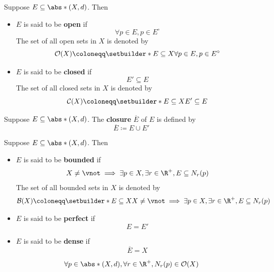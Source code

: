 \begin{definition} \label{an1:def:open-closed-sets}
  Suppose $E \subseteq \abs*{(X, d)}$. Then
  \begin{itemize}
    \item $E$ is said to be \textbf{open} if
          \[
            \forall p \in E, p \in E^{\circ}
          \]
          The set of all open sets in $X$ is denoted by
          \[
            \mathcal{O}(X) \coloneqq \setbuilder*{E \subseteq X}{\forall p \in E, p \in E^{\circ}}
          \]
    \item $E$ is said to be \textbf{closed} if
          \[
            E' \subseteq E
          \]
          The set of all closed sets in $X$ is denoted by
          \[
            \mathcal{C}(X) \coloneqq \setbuilder*{E \subseteq X}{E' \subseteq E}
          \]
  \end{itemize}
\end{definition}

\begin{definition} \label{an1:def:closure}
  Suppose $E \subseteq \abs*{(X, d)}$. The \textbf{closure} $\overline{E}$ of $E$ is defined by
  \[
    \overline{E} \coloneqq E \cup E'
  \]
\end{definition}

\begin{definition} \label{an1:def:bounded-perfect-dense-sets}
  Suppose $E \subseteq \abs*{(X, d)}$. Then
  \begin{itemize}
    \item $E$ is said to be \textbf{bounded} if
          \[
            X \neq \vnot \implies \exists p \in X, \exists r \in \R^{+}, E \subseteq N_{r}(p)
          \]
          The set of all bounded sets in $X$ is denoted by
          \[
            \mathcal{B}(X) \coloneqq \setbuilder*{E \subseteq X}{
              X \neq \vnot \implies \exists p \in X, \exists r \in \R^{+}, E \subseteq N_{r}(p)
            }
          \]
    \item $E$ is said to be \textbf{perfect} if
          \[
            E = E'
          \]
    \item $E$ is said to be \textbf{dense} if
          \[
            \overline{E} = X
          \]
  \end{itemize}
\end{definition}

\begin{theorem} \label{an1:thm:neighborhood-is-open}
  \[
    \forall p \in \abs*{(X, d)}, \forall r \in \R^{+}, N_{r}(p) \in \mathcal{O}(X)
  \]
\end{theorem}

